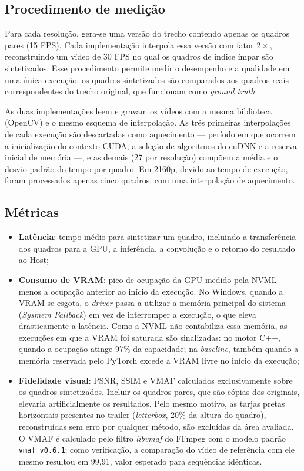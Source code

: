 \documentclass[
    12pt,                %
    openright,           %
    oneside,             %
    a4paper,             %
    english,             %
    brazil               %
]{abntex2}
\begin{document}
\subsection{Procedimento de medição}

Para cada resolução, gera-se uma versão do trecho contendo apenas os quadros pares (15 FPS). Cada implementação interpola essa versão com fator $2\times$, reconstruindo um vídeo de 30 FPS no qual os quadros de índice ímpar são sintetizados. Esse procedimento permite medir o desempenho e a qualidade em uma única execução: os quadros sintetizados são comparados aos quadros reais correspondentes do trecho original, que funcionam como \textit{ground truth}.

As duas implementações leem e gravam os vídeos com a mesma biblioteca (OpenCV) e o mesmo esquema de interpolação. As três primeiras interpolações de cada execução são descartadas como aquecimento --- período em que ocorrem a inicialização do contexto CUDA, a seleção de algoritmos do cuDNN e a reserva inicial de memória ---, e as demais (27 por resolução) compõem a média e o desvio padrão do tempo por quadro. Em 2160p, devido ao tempo de execução, foram processados apenas cinco quadros, com uma interpolação de aquecimento.

\subsection{Métricas}

\begin{itemize}
    \item \textbf{Latência}: tempo médio para sintetizar um quadro, incluindo a transferência dos quadros para a GPU, a inferência, a convolução e o retorno do resultado ao Host;
    \item \textbf{Consumo de VRAM}: pico de ocupação da GPU medido pela NVML menos a ocupação anterior ao início da execução. No Windows, quando a VRAM se esgota, o \textit{driver} passa a utilizar a memória principal do sistema (\textit{Sysmem Fallback}) em vez de interromper a execução, o que eleva drasticamente a latência. Como a NVML não contabiliza essa memória, as execuções em que a VRAM foi saturada são sinalizadas: no motor C++, quando a ocupação atinge 97\% da capacidade; na \textit{baseline}, também quando a memória reservada pelo PyTorch excede a VRAM livre no início da execução;
    \item \textbf{Fidelidade visual}: PSNR, SSIM e VMAF calculados exclusivamente sobre os quadros sintetizados. Incluir os quadros pares, que são cópias dos originais, elevaria artificialmente os resultados. Pelo mesmo motivo, as tarjas pretas horizontais presentes no trailer (\textit{letterbox}, 20\% da altura do quadro), reconstruídas sem erro por qualquer método, são excluídas da área avaliada. O VMAF é calculado pelo filtro \textit{libvmaf} do FFmpeg com o modelo padrão \texttt{vmaf\_v0.6.1}; como verificação, a comparação do vídeo de referência com ele mesmo resultou em 99,91, valor esperado para sequências idênticas.
\end{itemize}
\end{document}
